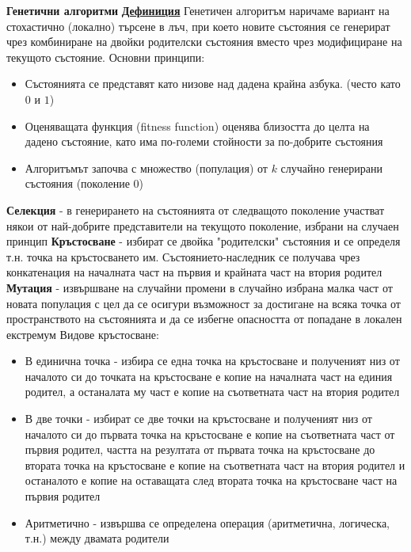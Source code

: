 \documentclass{article}
\begin{document}
\textbf{Генетични алгоритми} \newline\newline
\textbf{\underline{Дефиниция}}
Генетичен алгоритъм наричаме вариант на стохастично (локално) търсене в лъч, при което новите състояния се генерират чрез
комбиниране на двойки родителски състояния вместо чрез модифициране на текущото състояние. \newline\newline
Основни принципи:
\begin{itemize}
    \item Състоянията се представят като низове над дадена крайна азбука. (често като $0$ и $1$)
    \item Оценяващата функция (fitness function) оценява близостта до целта на дадено състояние, като има по-големи стойности
    за по-добрите състояния
    \item Алгоритъмът започва с множество (популация) от $k$ случайно генерирани състояния (поколение 0)
\end{itemize}
\textbf{Селекция} - в генерирането на състоянията от следващото поколение участват някои от най-добрите представители на
текущото поколение, избрани на случаен принцип \newline\newline
\textbf{Кръстосване} - избират се двойка "родителски" състояния и се определя т.н. точка на кръстосването им. Състоянието-наследник
се получава чрез конкатенация на началната част на първия и крайната част на втория родител \newline\newline
\textbf{Мутация} - извършване на случайни промени в случайно избрана малка част от новата популация с цел да се осигури
възможност за достигане на всяка точка от пространството на състоянията и да се избегне опасността от попадане в локален екстремум \newline\newline
Видове кръстосване:
\begin{itemize}
    \item В единична точка - избира се една точка на кръстосване и полученият низ от началото си до точката на кръстосване е
    копие на началната част на единия родител, а останалата му част е копие на съответната част на втория родител
    \item В две точки - избират се две точки на кръстосване и полученият низ от началото си до първата точка на кръстосване е
    копие на съответната част от първия родител, частта на резултата от първата точка на кръстосване до втората точка на
    кръстосване е копие на съответната част на втория родител и останалото е копие на оставащата след втората точка на
    кръстосване част на първия родител
    \item Аритметично - извършва се определена операция (аритметична, логическа, т.н.) между двамата родители
\end{itemize}
\end{document}
